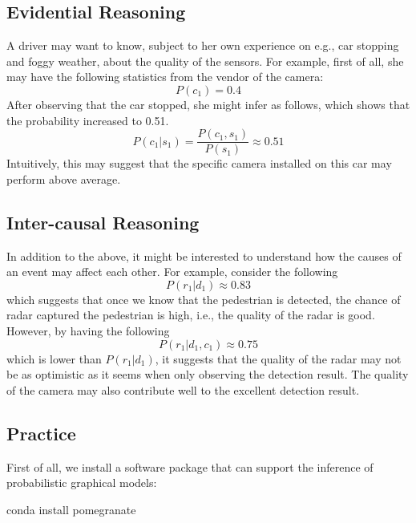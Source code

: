 \subsection{Evidential Reasoning}

A driver may want to know, subject to her own experience on e.g., car stopping and foggy weather, about the quality of the sensors. For example, first of all, she may have the following statistics from the vendor of the camera: 
\begin{equation}
    P(c_1) = 0.4 
\end{equation}
After observing that the car stopped, she might infer as follows, which shows that the probability increased to 0.51.  
\begin{equation}
    P(c_1|s_1) = \frac{P(c_1,s_1)}{P(s_1)} \approx 0.51 
\end{equation}
Intuitively, this may suggest that the specific camera installed on this car may perform above average. 

\subsection{Inter-causal Reasoning }

In addition to the above, it might be interested to understand how the causes of an event may affect each other. For example, consider the following 
\begin{equation}
    P(r_1|d_1) \approx 0.83 
\end{equation}
which suggests that once we know that the pedestrian is detected, the chance of radar captured the pedestrian is high, i.e., the quality of the radar is good. However, by having the following  
\begin{equation}
    P(r_1|d_1,c_1) \approx 0.75
\end{equation}
which is lower than $P(r_1|d_1)$, it suggests that the quality of the radar may not be as optimistic as it seems when only observing the detection result. The quality of the camera may also contribute well to the excellent detection result.  

\subsection{Practice}

First of all, we install a software package that can support the inference of probabilistic graphical models: 

\begin{cmds}
conda install pomegranate
\end{cmds}

